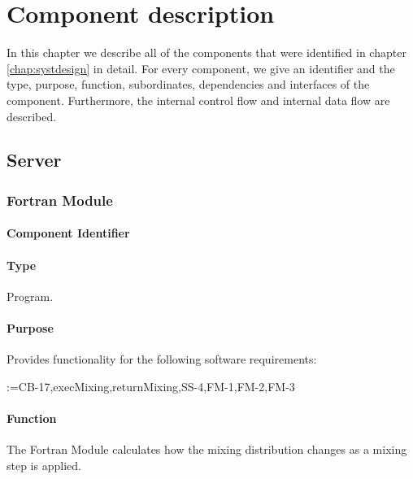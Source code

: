\makeatletter
\newcommand\addtosrqlist[1]{%
  \def\tempa{}%
  \@for\reserved:=#1\do{%
    \ifx\tempa\empty\else, \fi SRQ\srqref{\reserved}%
    \edef\tempa{something}%
  }
}
\makeatother

\chapter{Component description}
\label{chap:compdescr}
In this chapter we describe all of the components that were identified in chapter \ref{chap:systdesign} in detail. For every component, we give an identifier and the type, purpose, function, subordinates, dependencies and interfaces of the component. Furthermore, the internal control flow and internal data flow are described.

\section{Server}
\subsection{Fortran Module}
\label{subsec:fortranmodule}

\subsubsection*{Component Identifier}
\RTMSFM{}

\subsubsection*{Type}
Program.

\subsubsection*{Purpose}
Provides functionality for the following software requirements:

\noindent \addtosrqlist{CB-17,execMixing,returnMixing,SS-4,FM-1,FM-2,FM-3}

\subsubsection*{Function}
The Fortran Module calculates how the mixing distribution changes as a mixing step is applied.

